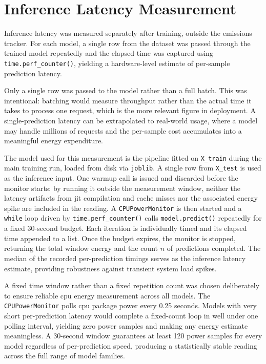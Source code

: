 \section{Inference Latency Measurement}
\label{implementation_inference}

Inference latency was measured separately after training, outside the emissions tracker. For each model, a single row from the dataset was passed through the trained model repeatedly and the elapsed time was captured using \texttt{time.perf\_counter()}, yielding a hardware-level estimate of per-sample prediction latency.

Only a single row was passed to the model rather than a full batch. This was intentional: batching would measure throughput rather than the actual time it takes to process one request, which is the more relevant figure in deployment. A single-prediction latency can be extrapolated to real-world usage, where a model may handle millions of requests and the per-sample cost accumulates into a meaningful energy expenditure.

The model used for this measurement is the pipeline fitted on \texttt{X\_train} during the main training run, loaded from disk via \texttt{joblib}. A single row from \texttt{X\_test} is used as the inference input. One warmup call is issued and discarded before the monitor starts: by running it outside the measurement window, neither the latency artifacts from \gls{jit} compilation and cache misses nor the associated energy spike are included in the reading. A \texttt{CPUPowerMonitor} is then started and a \texttt{while} loop driven by \texttt{time.perf\_counter()} calls \texttt{model.predict()} repeatedly for a fixed 30-second budget. Each iteration is individually timed and its elapsed time appended to a list. Once the budget expires, the monitor is stopped, returning the total window energy and the count $n$ of predictions completed. The median of the recorded per-prediction timings serves as the inference latency estimate, providing robustness against transient system load spikes.

A fixed time window rather than a fixed repetition count was chosen deliberately to ensure reliable \gls{cpu} energy measurement across all models. The \texttt{CPUPowerMonitor} polls \gls{cpu} package power every 0.25 seconds. Models with very short per-prediction latency would complete a fixed-count loop in well under one polling interval, yielding zero power samples and making any energy estimate meaningless. A 30-second window guarantees at least 120 power samples for every model regardless of per-prediction speed, producing a statistically stable reading across the full range of model families.

